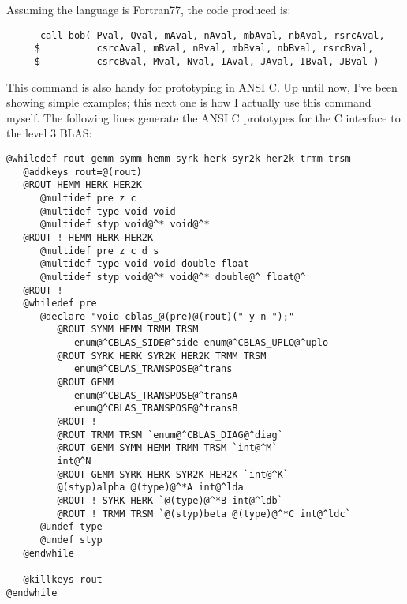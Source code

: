 \noindent
Assuming the language is Fortran77, the code produced is:
\begin{verbatim}
      call bob( Pval, Qval, mAval, nAval, mbAval, nbAval, rsrcAval, 
     $          csrcAval, mBval, nBval, mbBval, nbBval, rsrcBval, 
     $          csrcBval, Mval, Nval, IAval, JAval, IBval, JBval )
\end{verbatim}

This command is also handy for prototyping in ANSI C.  Up until now,
I've been showing simple examples;  this next one is how I actually
use this command myself.  The following lines generate the ANSI C
prototypes for the C interface to the level 3 BLAS:

\begin{verbatim}
@whiledef rout gemm symm hemm syrk herk syr2k her2k trmm trsm
   @addkeys rout=@(rout)
   @ROUT HEMM HERK HER2K
      @multidef pre z c
      @multidef type void void
      @multidef styp void@^* void@^*
   @ROUT ! HEMM HERK HER2K
      @multidef pre z c d s
      @multidef type void void double float
      @multidef styp void@^* void@^* double@^ float@^
   @ROUT !
   @whiledef pre
      @declare "void cblas_@(pre)@(rout)(" y n ");"
         @ROUT SYMM HEMM TRMM TRSM 
            enum@^CBLAS_SIDE@^side enum@^CBLAS_UPLO@^uplo
         @ROUT SYRK HERK SYR2K HER2K TRMM TRSM 
            enum@^CBLAS_TRANSPOSE@^trans
         @ROUT GEMM
            enum@^CBLAS_TRANSPOSE@^transA
            enum@^CBLAS_TRANSPOSE@^transB
         @ROUT !
         @ROUT TRMM TRSM `enum@^CBLAS_DIAG@^diag`
         @ROUT GEMM SYMM HEMM TRMM TRSM `int@^M`
         int@^N
         @ROUT GEMM SYRK HERK SYR2K HER2K `int@^K`
         @(styp)alpha @(type)@^*A int@^lda
         @ROUT ! SYRK HERK `@(type)@^*B int@^ldb`
         @ROUT ! TRMM TRSM `@(styp)beta @(type)@^*C int@^ldc`
      @undef type
      @undef styp
   @endwhile

   @killkeys rout
@endwhile
\end{verbatim}

